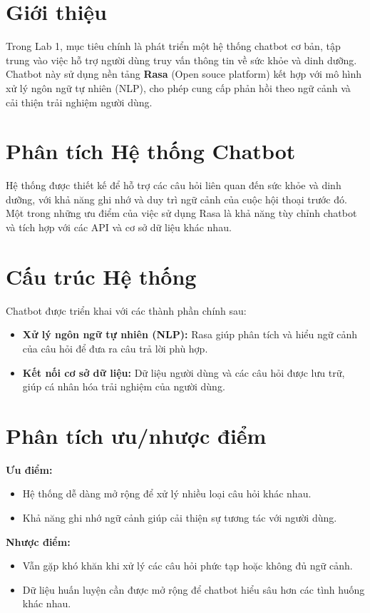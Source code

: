 \documentclass[a4paper,12pt]{report}
\begin{document}
\section{Giới thiệu}
Trong Lab 1, mục tiêu chính là phát triển một hệ thống chatbot cơ bản, tập trung vào việc hỗ trợ người dùng truy vấn thông tin về sức khỏe và dinh dưỡng. Chatbot này sử dụng nền tảng \textbf{Rasa} (Open souce platform) kết hợp với mô hình xử lý ngôn ngữ tự nhiên (NLP), cho phép cung cấp phản hồi theo ngữ cảnh và cải thiện trải nghiệm người dùng.

\section{Phân tích Hệ thống Chatbot}
Hệ thống được thiết kế để hỗ trợ các câu hỏi liên quan đến sức khỏe và dinh dưỡng, với khả năng ghi nhớ và duy trì ngữ cảnh của cuộc hội thoại trước đó. Một trong những ưu điểm của việc sử dụng Rasa là khả năng tùy chỉnh chatbot và tích hợp với các API và cơ sở dữ liệu khác nhau.

\section{Cấu trúc Hệ thống}
Chatbot được triển khai với các thành phần chính sau:
\begin{itemize}
    \item \textbf{Xử lý ngôn ngữ tự nhiên (NLP):} Rasa giúp phân tích và hiểu ngữ cảnh của câu hỏi để đưa ra câu trả lời phù hợp.
    \item \textbf{Kết nối cơ sở dữ liệu:} Dữ liệu người dùng và các câu hỏi được lưu trữ, giúp cá nhân hóa trải nghiệm của người dùng.
\end{itemize}

\section{Phân tích ưu/nhược điểm}

\textbf{Ưu điểm:}
\begin{itemize}
    \item Hệ thống dễ dàng mở rộng để xử lý nhiều loại câu hỏi khác nhau.
    \item Khả năng ghi nhớ ngữ cảnh giúp cải thiện sự tương tác với người dùng.
\end{itemize}

\textbf{Nhược điểm:}
\begin{itemize}
    \item Vẫn gặp khó khăn khi xử lý các câu hỏi phức tạp hoặc không đủ ngữ cảnh.
    \item Dữ liệu huấn luyện cần được mở rộng để chatbot hiểu sâu hơn các tình huống khác nhau.
\end{itemize}
\end{document}
